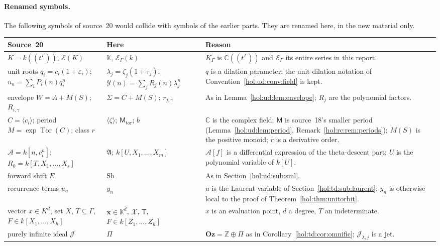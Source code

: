 \documentclass[11pt]{article}
\numberwithin{equation}{section}
\theoremstyle{definition}
\theoremstyle{remark}
\newcommand{\C}{\mathbb C}
\newcommand{\Z}{\mathbb Z}
\newcommand{\K}{K_\Gamma}
\newcommand{\E}{\mathcal E_\Gamma}
\newcommand{\KK}{\mathbb K}
\newcommand{\EK}{\mathcal E_\Gamma(k)}
\newcommand{\jet}[2]{\mathcal J_{#1,#2}}
\newcommand{\Oz}{\mathbf{Oz}}
\begin{document}
\paragraph{Renamed symbols.}
The following symbols of source~20 would collide with symbols of the earlier
parts. They are renamed here, in the new material only.
{\small
\begin{longtable}{@{}>{\raggedright\arraybackslash}p{}
>{\raggedright\arraybackslash}p{}
>{\raggedright\arraybackslash}p{}@{}}
\toprule
Source~20 & Here & Reason\\
\midrule
\endhead
$K=k((t^\Gamma))$, $\mathcal E(K)$ & $\KK$, $\EK$ & $\K$ is $\C((t^\Gamma))$
and $\E$ its entire series in this report.\\
unit roots $q_i=c_i(1+\varepsilon_i)$; $u_n=\sum_iP_i(n)q_i^n$ &
$\lambda_j=\zeta_j(1+\tau_j)$; $\mathcal Y(n)=\sum_jR_j(n)\lambda_j^n$ & $q$ is
a dilation parameter; the unit-dilation notation of
Convention~\ref{hol:ud:conv:field} is kept.\\
envelope $W=A+M(S)$; $R_{i,\gamma}$ & $\Sigma=C+M(S)$; $r_{j,\gamma}$ & As in
Lemma~\ref{hol:ud:lem:envelope}; $R_j$ are the polynomial factors.\\
$C=\langle c_i\rangle$; period $M=\exp\operatorname{Tor}(C)$; class $r$ &
$\langle\zeta\rangle$; $\mathsf M_{\mathrm{tor}}$; $b$ & $\C$ is the complex
field; $\mathsf M$ is source~18's smaller period
(Lemma~\ref{hol:ud:lem:period}, Remark~\ref{hol:rc:rem:periods}); $M(S)$ is
the positive monoid; $r$ is a derivative order.\\
$\mathcal A=k[n,c_i^n]$; $R_0=k[T,X_1,\ldots,X_s]$ & $\mathfrak A$;
$k[U,X_1,\ldots,X_m]$ & $\mathcal A[f]$ is a differential expression of the
theta-descent part; $U$ is the polynomial variable of $k[U]$.\\
forward shift $E$ & $\mathrm{Sh}$ & As in Section~\ref{hol:ud:sub:sml}.\\
recurrence terms $u_n$ & $y_n$ & $u$ is the Laurent variable of
Section~\ref{hol:td:sub:laurent}; $y_n$ is otherwise local to the proof of
Theorem~\ref{hol:thm:unitorbit}.\\
vector $x\in K^d$, set $X$, $T\subseteq\Gamma$, $F\in k[X_1,\ldots,X_h]$ &
$\mathbf x\in\KK^{\bar d}$, $\mathcal X$, $\mathsf T$, $F\in
k[Z_1,\ldots,Z_h]$ & $x$ is an evaluation point, $d$ a degree, $T$ an
indeterminate.\\
purely infinite ideal $\mathcal J$ & $\Pi$ & $\Oz=\Z\oplus\Pi$ as in
Corollary~\ref{hol:td:cor:omnific}; $\jet\lambda j$ is a jet.\\

\end{longtable}}
\end{document}
